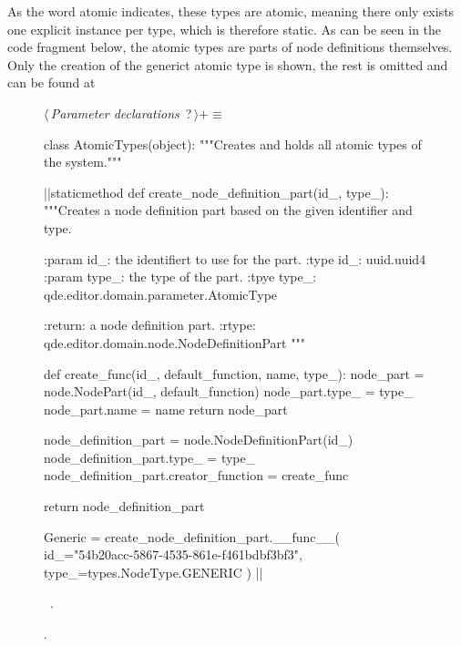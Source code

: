 \documentclass[%
    a4paper,    %
    justified,  %
    nobib,      %
    openany     %
]{tufte-book}
\begin{document}
As the word atomic indicates, these types are atomic, meaning there only exists
one explicit instance per type, which is therefore static. As can be seen in
the code fragment below, the atomic types are parts of node definitions
themselves. Only the creation of the generict atomic type is shown, the rest is
omitted and can be found at~

\begin{figure}
\begin{flushleft} \small
\begin{minipage}{\linewidth}\label{scrap65}\raggedright\small
{} $\langle\,${\itshape Parameter declarations}\nobreak\ {\footnotesize {?}}$\,\rangle+\equiv$
\vspace{-1ex}
\begin{pythoncode}
class AtomicTypes(object):
    """Creates and holds all atomic types of the system."""

    |\normalfont{}\fontfamily{}|staticmethod
    def create_node_definition_part(id_, type_):
        """Creates a node definition part based on the given identifier and
        type.

        :param id_: the identifiert to use for the part.
        :type  id_: uuid.uuid4
        :param type_: the type of the part.
        :tpye type_: qde.editor.domain.parameter.AtomicType

        :return: a node definition part.
        :rtype: qde.editor.domain.node.NodeDefinitionPart
        """

        def create_func(id_, default_function, name, type_):
            node_part = node.NodePart(id_, default_function)
            node_part.type_ = type_
            node_part.name = name
            return node_part

        node_definition_part = node.NodeDefinitionPart(id_)
        node_definition_part.type_ = type_
        node_definition_part.creator_function = create_func

        return node_definition_part

    Generic = create_node_definition_part.__func__(
        id_="54b20acc-5867-4535-861e-f461bdbf3bf3",
        type_=types.NodeType.GENERIC
    )
|\NWsep|
\end{pythoncode}
\vspace{1.5ex}
\footnotesize
\begin{list}{}{\setlength{\itemsep}{-\parsep}\setlength{\itemindent}{-\leftmargin}}
\item \NWtxtMacroDefBy\ .
\item {\NWtxtMacroNoRef}.


\end{list}
\end{minipage}
\end{flushleft}
\end{figure}
\end{document}
